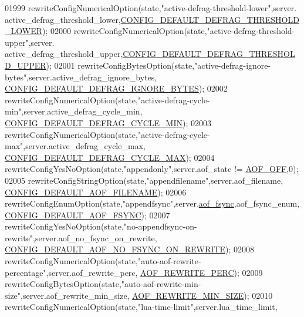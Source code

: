 \begin{DoxyCode}
{{{{{{{{{{{{{{{{{{{{{{{{{{{{01999     rewriteConfigNumericalOption(state,\textcolor{stringliteral}{"active-defrag-threshold-lower"},server.
      active\_defrag\_threshold\_lower,\hyperlink{server_8h_a9d23ea1ff80f9db5faef6f5aca6f76aa}{CONFIG\_DEFAULT\_DEFRAG\_THRESHOLD\_LOWER});
02000     rewriteConfigNumericalOption(state,\textcolor{stringliteral}{"active-defrag-threshold-upper"},server.
      active\_defrag\_threshold\_upper,\hyperlink{server_8h_a75b8ce2fafb93ddeb96f0e5602c2bd0c}{CONFIG\_DEFAULT\_DEFRAG\_THRESHOLD\_UPPER});
02001     rewriteConfigBytesOption(state,\textcolor{stringliteral}{"active-defrag-ignore-bytes"},server.active\_defrag\_ignore\_bytes,
      \hyperlink{server_8h_aed98ddd341b643d52417b875418b2ecb}{CONFIG\_DEFAULT\_DEFRAG\_IGNORE\_BYTES});
02002     rewriteConfigNumericalOption(state,\textcolor{stringliteral}{"active-defrag-cycle-min"},server.active\_defrag\_cycle\_min,
      \hyperlink{server_8h_a5d49d5c9a11564577f7e78d6f52d9db5}{CONFIG\_DEFAULT\_DEFRAG\_CYCLE\_MIN});
02003     rewriteConfigNumericalOption(state,\textcolor{stringliteral}{"active-defrag-cycle-max"},server.active\_defrag\_cycle\_max,
      \hyperlink{server_8h_ac3f69c7e78a189639eab66a2b32753d0}{CONFIG\_DEFAULT\_DEFRAG\_CYCLE\_MAX});
02004     rewriteConfigYesNoOption(state,\textcolor{stringliteral}{"appendonly"},server.aof\_state != \hyperlink{server_8h_a5226306fbcebcb6d5d02e0fef3c213c2}{AOF\_OFF},0);
02005     rewriteConfigStringOption(state,\textcolor{stringliteral}{"appendfilename"},server.aof\_filename,
      \hyperlink{server_8h_af3bada72076c951a9d5959e73456635a}{CONFIG\_DEFAULT\_AOF\_FILENAME});
02006     rewriteConfigEnumOption(state,\textcolor{stringliteral}{"appendfsync"},server.\hyperlink{config_8h_af5994c643c434574580bb7816af82cad}{aof\_fsync},aof\_fsync\_enum,
      \hyperlink{server_8h_af07bcc4b15ed4f7aed3f6efcb483b75b}{CONFIG\_DEFAULT\_AOF\_FSYNC});
02007     rewriteConfigYesNoOption(state,\textcolor{stringliteral}{"no-appendfsync-on-rewrite"},server.aof\_no\_fsync\_on\_rewrite,
      \hyperlink{server_8h_a9b588e3803fff7fe515f20d7bc4aa8e6}{CONFIG\_DEFAULT\_AOF\_NO\_FSYNC\_ON\_REWRITE});
02008     rewriteConfigNumericalOption(state,\textcolor{stringliteral}{"auto-aof-rewrite-percentage"},server.aof\_rewrite\_perc,
      \hyperlink{server_8h_a85f5870a07f58d1679988f7eb84ca995}{AOF\_REWRITE\_PERC});
02009     rewriteConfigBytesOption(state,\textcolor{stringliteral}{"auto-aof-rewrite-min-size"},server.aof\_rewrite\_min\_size,
      \hyperlink{server_8h_a9b5a91047aa18eb5df52e99c97afab84}{AOF\_REWRITE\_MIN\_SIZE});
02010     rewriteConfigNumericalOption(state,\textcolor{stringliteral}{"lua-time-limit"},server.lua\_time\_limit,
}}}}}}}}}}}}}}}}}}}}}}}}}}}}
\end{DoxyCode}
